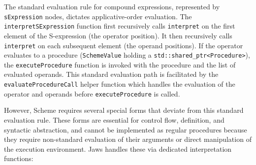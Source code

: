 \documentclass[final]{cmpreport_02}
\begin{document}
The standard evaluation rule for compound expressions, represented by \texttt{sExpression} nodes, dictates applicative-order evaluation. The \texttt{interpretSExpression} function first recursively calls \texttt{interpret} on the first element of the S-expression (the operator position). It then recursively calls \texttt{interpret} on each subsequent element (the operand positions). If the operator evaluates to a procedure (\texttt{SchemeValue} holding a \texttt{std::shared\_ptr<Procedure>}), the \texttt{executeProcedure} function is invoked with the procedure and the list of evaluated operands. This standard evaluation path is facilitated by the \texttt{evaluateProcedureCall} helper function which handles the evaluation of the operator and operands before \texttt{executeProcedure} is called.

However, Scheme requires several special forms that deviate from this standard evaluation rule. These forms are essential for control flow, definition, and syntactic abstraction, and cannot be implemented as regular procedures because they require non-standard evaluation of their arguments or direct manipulation of the execution environment. Jaws handles these via dedicated interpretation functions:
\end{document}
